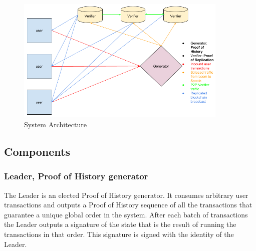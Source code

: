 \documentclass[12pt]{article}
\begin{document}
\begin{figure}
  \begin{center}
    \centering
    \includegraphics[width=0.9\textwidth]{figures/system_arch_001.png}
    \caption[Fig 9]{System Architecture \label{fig_9}}
  \end{center}
  \end{figure}

\subsection{Components}

\subsubsection{Leader, Proof of History generator}
The Leader is an elected Proof of History generator. It consumes arbitrary user transactions and outputs a Proof of History sequence of all the transactions that guarantee a unique global order in the system. After each batch of transactions the Leader outputs a signature of the state that is the result of running the transactions in that order. This signature is signed with the identity of the Leader.
\end{document}
